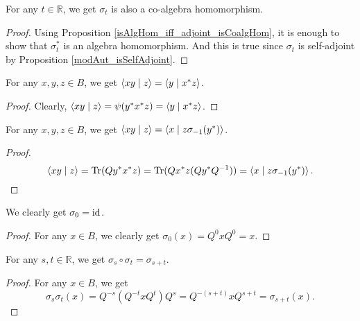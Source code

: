  \begin{corollary}\label{modAut_isCoalgHom}
  \leanok
  For any $t\in\mathbb{R}$, we get $\sigma_t$ is also a co-algebra homomorphism.
 \end{corollary}
 \begin{proof}
  \leanok
  Using Proposition \ref{isAlgHom_iff_adjoint_isCoalgHom}, it is enough to show that $\sigma_t^*$ is an algebra homomorphism. And this is true since $\sigma_t$ is self-adjoint by Proposition \ref{modAut_isSelfAdjoint}.
 \end{proof}
 
 \begin{lemma}\label{inner_star_left}
  \leanok
  For any $x,y,z\in{B}$, we get $\left\langle xy \mid z\right\rangle=\left\langle y \mid x^*z\right\rangle$.
 \end{lemma}
 \begin{proof}\leanok
  Clearly, $\left\langle xy \mid z\right\rangle=\psi(y^*x^*z)=\left\langle y \mid x^*z\right\rangle$.
 \end{proof}

 \begin{lemma}\label{inner_conj_left}
  \leanok
  For any $x,y,z\in{B}$, we get $\left\langle xy \mid z\right\rangle=\left\langle x \mid z\sigma_{-1}(y^*)\right\rangle$.
 \end{lemma}
 \begin{proof}\leanok
  \[\left\langle xy \mid z\right\rangle=\operatorname{Tr}(Q{y^*x^*}z)=\operatorname{Tr}(Qx^*z(Qy^*Q^{-1}))=\left\langle x \mid z\sigma_{-1}(y^*)\right\rangle.\]
 \end{proof}

 \begin{lemma}\label{modAut_zero}
  \leanok
  We clearly get $\sigma_0=\operatorname{id}$.
 \end{lemma}
 \begin{proof}\leanok
  For any $x\in{B}$, we clearly get $\sigma_0(x)=Q^0xQ^0=x$.
 \end{proof}

 \begin{lemma}\label{modAut_comp}
  \leanok
  For any $s,t\in\mathbb{R}$, we get $\sigma_s\circ\sigma_t=\sigma_{s+t}$.
 \end{lemma}
 \begin{proof}\leanok
  For any $x\in{B}$, we get
  \[\sigma_s\sigma_t(x)=Q^{-s}(Q^{-t}xQ^t)Q^s=Q^{-(s+t)}xQ^{s+t}=\sigma_{s+t}(x).\]
 \end{proof}
 
